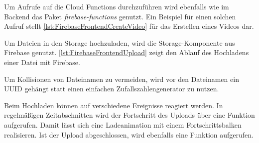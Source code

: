 

Um Aufrufe auf die Cloud Functions durchzuführen wird ebenfalls wie im Backend das Paket \textit{firebase-functions} genutzt. Ein Beispiel für einen solchen Aufruf stellt \autoref{lst:FirebaseFrontendCreateVideo} für das Erstellen eines Videos dar.



Um Dateien in den Storage hochzuladen, wird die Storage-Komponente aus Firebase genutzt. \autoref{lst:FirebaseFrontendUpload} zeigt den Ablauf des Hochladens einer Datei mit Firebase.



Um Kollisionen von Dateinamen zu vermeiden, wird vor den Dateinamen ein \ac{UUID} gehängt statt einen einfachen Zufallszahlengenerator zu nutzen.

Beim Hochladen können auf verschiedene Ereignisse reagiert werden. In regelmäßigen Zeitabschnitten wird der Fortschritt des Uploads über eine Funktion aufgerufen. Damit lässt sich eine Ladeanimation mit einem Fortschrittsbalken realisieren. Ist der Upload abgeschlossen, wird ebenfalls eine Funktion aufgerufen.